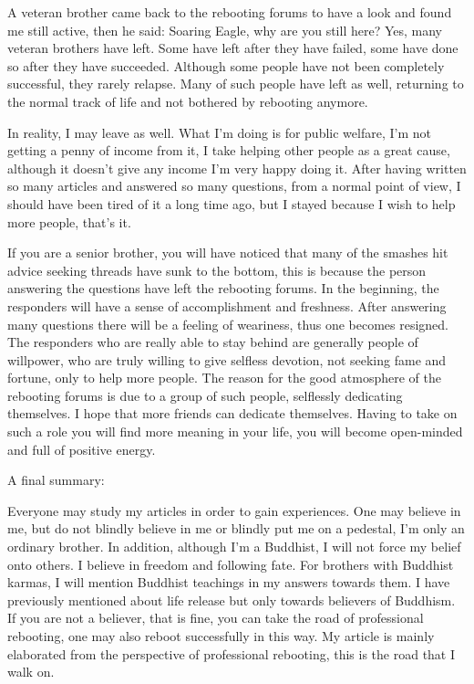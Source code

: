 \documentclass[
]{book}
\begin{document}
A veteran brother came back to the rebooting forums to have a look and found me still active, then he said: Soaring Eagle, why are you still here? Yes, many veteran brothers have left. Some have left after they have failed, some have done so after they have succeeded. Although some people have not been completely successful, they rarely relapse. Many of such people have left as well, returning to the normal track of life and not bothered by rebooting anymore.

In reality, I may leave as well. What I'm doing is for public welfare, I'm not getting a penny of income from it, I take helping other people as a great cause, although it doesn't give any income I'm very happy doing it. After having written so many articles and answered so many questions, from a normal point of view, I should have been tired of it a long time ago, but I stayed because I wish to help more people, that's it.

If you are a senior brother, you will have noticed that many of the smashes hit advice seeking threads have sunk to the bottom, this is because the person answering the questions have left the rebooting forums. In the beginning, the responders will have a sense of accomplishment and freshness. After answering many questions there will be a feeling of weariness, thus one becomes resigned. The responders who are really able to stay behind are generally people of willpower, who are truly willing to give selfless devotion, not seeking fame and fortune, only to help more people. The reason for the good atmosphere of the rebooting forums is due to a group of such people, selflessly dedicating themselves. I hope that more friends can dedicate themselves. Having to take on such a role you will find more meaning in your life, you will become open-minded and full of positive energy.

A final summary:

Everyone may study my articles in order to gain experiences. One may believe in me, but do not blindly believe in me or blindly put me on a pedestal, I'm only an ordinary brother. In addition, although I'm a Buddhist, I will not force my belief onto others. I believe in freedom and following fate. For brothers with Buddhist karmas, I will mention Buddhist teachings in my answers towards them. I have previously mentioned about life release but only towards believers of Buddhism. If you are not a believer, that is fine, you can take the road of professional rebooting, one may also reboot successfully in this way. My article is mainly elaborated from the perspective of professional rebooting, this is the road that I walk on.
\end{document}
